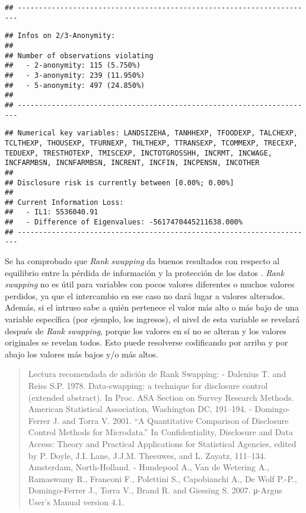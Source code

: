 \documentclass[
]{book}
\theoremstyle{definition}
\theoremstyle{definition}
\theoremstyle{definition}
\theoremstyle{definition}
\theoremstyle{remark}
\begin{document}
\begin{verbatim}
## ----------------------------------------------------------------------
\end{verbatim}

\begin{verbatim}
## Infos on 2/3-Anonymity:
## 
## Number of observations violating
##   - 2-anonymity: 115 (5.750%)
##   - 3-anonymity: 239 (11.950%)
##   - 5-anonymity: 497 (24.850%)
## 
## ----------------------------------------------------------------------
\end{verbatim}

\begin{verbatim}
## Numerical key variables: LANDSIZEHA, TANHHEXP, TFOODEXP, TALCHEXP, TCLTHEXP, THOUSEXP, TFURNEXP, THLTHEXP, TTRANSEXP, TCOMMEXP, TRECEXP, TEDUEXP, TRESTHOTEXP, TMISCEXP, INCTOTGROSSHH, INCRMT, INCWAGE, INCFARMBSN, INCNFARMBSN, INCRENT, INCFIN, INCPENSN, INCOTHER
## 
## Disclosure risk is currently between [0.00%; 0.00%]
## 
## Current Information Loss:
##   - IL1: 5536040.91
##   - Difference of Eigenvalues: -5617470445211638.000%
## ----------------------------------------------------------------------
\end{verbatim}

Se ha comprobado que \emph{Rank swapping} da buenos resultados con respecto al equilibrio entre la pérdida de información y la protección de los datos \citep{DoTo01a}. \emph{Rank swapping} no es útil para variables con pocos valores diferentes o muchos valores perdidos, ya que el intercambio en ese caso no dará lugar a valores alterados. Además, si el intruso sabe a quién pertenece el valor más alto o más bajo de una variable específica (por ejemplo, los ingresos), el nivel de esta variable se revelará después de \emph{Rank swapping}, porque los valores en sí no se alteran y los valores originales se revelan todos. Esto puede resolverse codificando por arriba y por abajo los valores más bajos y/o más altos.

\begin{quote}
Lectura recomendada de adición de Rank Swapping:
- Dalenius T. and Reiss S.P. 1978. Data-swapping: a technique for disclosure control (extended abstract). In Proc. ASA Section on Survey Research Methods. American Statistical Association, Washington DC, 191--194.
- Domingo-Ferrer J. and Torra V. 2001. ``A Quantitative Comparison of Disclosure Control Methods for Microdata.'' In Confidentiality, Disclosure and Data Access: Theory and Practical Applications for Statistical Agencies, edited by P. Doyle, J.I. Lane, J.J.M. Theeuwes, and L. Zayatz, 111--134. Amsterdam, North-Holland.
- Hundepool A., Van de Wetering A., Ramaswamy R., Franconi F., Polettini S., Capobianchi A., De Wolf P.-P., Domingo-Ferrer J., Torra V., Brand R. and Giessing S. 2007. μ-Argus User's Manual version 4.1.
\end{quote}
\end{document}
